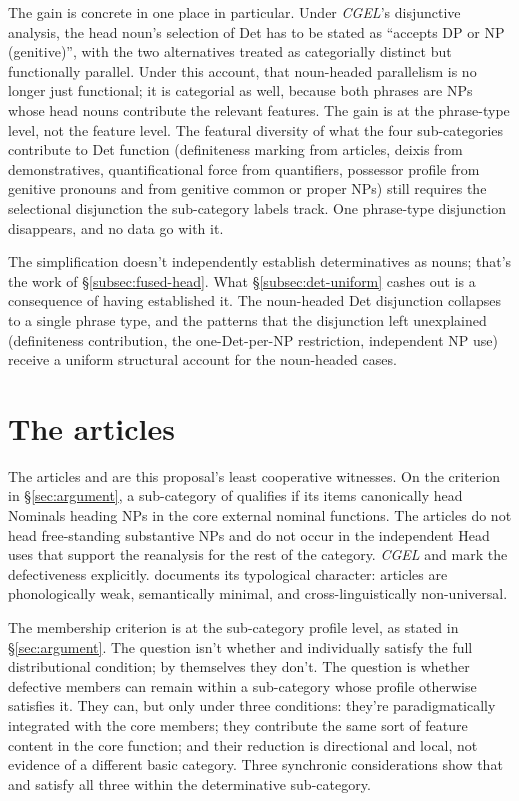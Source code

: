 \documentclass[12pt]{article}
\begin{document}
The gain is concrete in one place in particular. Under \textit{CGEL}'s disjunctive analysis, the head noun's selection of Det has to be stated as \enquote{accepts DP or NP (genitive)}, with the two alternatives treated as categorially distinct but functionally parallel. Under this account, that noun-headed parallelism is no longer just functional; it is categorial as well, because both phrases are NPs whose head nouns contribute the relevant features. The gain is at the phrase-type level, not the feature level. The featural diversity of what the four sub-categories contribute to Det function (definiteness marking from articles, deixis from demonstratives, quantificational force from quantifiers, possessor profile from genitive pronouns and from genitive common or proper NPs) still requires the selectional disjunction the sub-category labels track. One phrase-type disjunction disappears, and no data go with it.

The simplification doesn't independently establish determinatives as nouns; that's the work of §\ref{subsec:fused-head}. What §\ref{subsec:det-uniform} cashes out is a consequence of having established it. The noun-headed Det disjunction collapses to a single phrase type, and the patterns that the disjunction left unexplained (definiteness contribution, the one-Det-per-NP restriction, independent NP use) receive a uniform structural account for the noun-headed cases.

\section{The articles}\label{sec:articles}

The articles  and  are this proposal's least cooperative witnesses. On the criterion in §\ref{sec:argument}, a sub-category of  qualifies if its items canonically head Nominals heading NPs in the core external nominal functions. The articles do not head free-standing substantive NPs and do not occur in the independent Head uses that support the reanalysis for the rest of the category. \textit{CGEL} \citep[371--2]{huddleston2002} and \textcite[22--23]{Payne2007} mark the defectiveness explicitly. \textcite{lyons1999} documents its typological character: articles are phonologically weak, semantically minimal, and cross-linguistically non-universal.

The membership criterion is at the sub-category profile level, as stated in §\ref{sec:argument}. The question isn't whether  and  individually satisfy the full distributional condition; by themselves they don't. The question is whether defective members can remain within a sub-category whose profile otherwise satisfies it. They can, but only under three conditions: they're paradigmatically integrated with the core members; they contribute the same sort of feature content in the core function; and their reduction is directional and local, not evidence of a different basic category. Three synchronic considerations show that  and  satisfy all three within the determinative sub-category.
\end{document}
